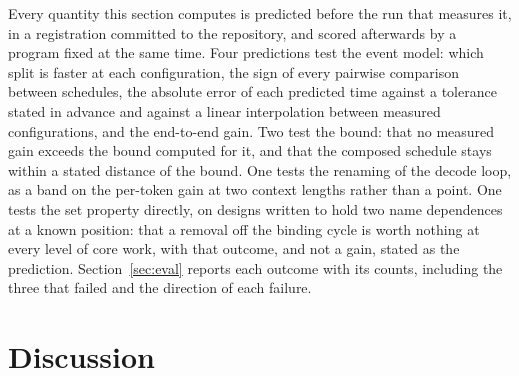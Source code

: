 \documentclass{article}
\begin{document}
Every quantity this section computes is predicted before the run that measures it, in a registration committed to the repository, and scored afterwards by a program fixed at the same time.
Four predictions test the event model: which split is faster at each configuration, the sign of every pairwise comparison between schedules, the absolute error of each predicted time against a tolerance stated in advance and against a linear interpolation between measured configurations, and the end-to-end gain.
Two test the bound: that no measured gain exceeds the bound computed for it, and that the composed schedule stays within a stated distance of the bound.
One tests the renaming of the decode loop, as a band on the per-token gain at two context lengths rather than a point.
One tests the set property directly, on designs written to hold two name dependences at a known position: that a removal off the binding cycle is worth nothing at every level of core work, with that outcome, and not a gain, stated as the prediction.
Section~\ref{sec:eval} reports each outcome with its counts, including the three that failed and the direction of each failure.


\section{Discussion}
\label{app:discussion}
\end{document}
